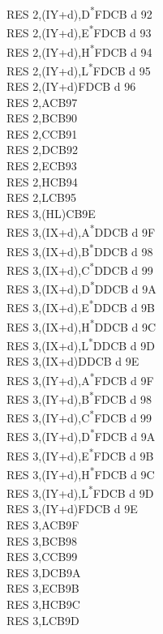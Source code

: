 \documentclass[twoside,openright,a4paper]{book}
\begin{document}
\begin{multicols}{3}
{\begin{tabbing}
	RES 2,(IY+d),D\textsuperscript{*}\>FDCB d 92\\
	RES 2,(IY+d),E\textsuperscript{*}\>FDCB d 93\\
	RES 2,(IY+d),H\textsuperscript{*}\>FDCB d 94\\
	RES 2,(IY+d),L\textsuperscript{*}\>FDCB d 95\\
	RES 2,(IY+d)\>FDCB d 96\\
	RES 2,A\>CB97\\
	RES 2,B\>CB90\\
	RES 2,C\>CB91\\
	RES 2,D\>CB92\\
	RES 2,E\>CB93\\
	RES 2,H\>CB94\\
	RES 2,L\>CB95\\
	RES 3,(HL)\>CB9E\\
	RES 3,(IX+d),A\textsuperscript{*}\>DDCB d 9F\\
	RES 3,(IX+d),B\textsuperscript{*}\>DDCB d 98\\
	RES 3,(IX+d),C\textsuperscript{*}\>DDCB d 99\\
	RES 3,(IX+d),D\textsuperscript{*}\>DDCB d 9A\\
	RES 3,(IX+d),E\textsuperscript{*}\>DDCB d 9B\\
	RES 3,(IX+d),H\textsuperscript{*}\>DDCB d 9C\\
	RES 3,(IX+d),L\textsuperscript{*}\>DDCB d 9D\\
	RES 3,(IX+d)\>DDCB d 9E\\
	RES 3,(IY+d),A\textsuperscript{*}\>FDCB d 9F\\
	RES 3,(IY+d),B\textsuperscript{*}\>FDCB d 98\\
	RES 3,(IY+d),C\textsuperscript{*}\>FDCB d 99\\
	RES 3,(IY+d),D\textsuperscript{*}\>FDCB d 9A\\
	RES 3,(IY+d),E\textsuperscript{*}\>FDCB d 9B\\
	RES 3,(IY+d),H\textsuperscript{*}\>FDCB d 9C\\
	RES 3,(IY+d),L\textsuperscript{*}\>FDCB d 9D\\
	RES 3,(IY+d)\>FDCB d 9E\\
	RES 3,A\>CB9F\\
	RES 3,B\>CB98\\
	RES 3,C\>CB99\\
	RES 3,D\>CB9A\\
	RES 3,E\>CB9B\\
	RES 3,H\>CB9C\\
	RES 3,L\>CB9D\\

\end{tabbing}}
\end{multicols}
\end{document}
